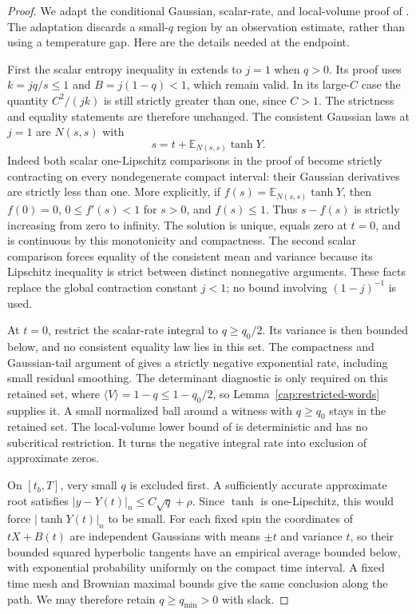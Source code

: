 \begin{proof}
We adapt the conditional Gaussian, scalar-rate, and local-volume proof of
\cite[Section~5]{AcceptedGap}.  The adaptation discards a small-$q$
region by an observation estimate, rather than using a temperature gap.
Here are the details needed at the endpoint.

First the scalar entropy inequality in \cite[Lemma~4.1]{AcceptedGap} extends
to $j=1$ when $q>0$. Its proof uses $k=jq/s\le1$ and $B=j(1-q)<1$, which
remain valid. In its large-$C$ case the quantity $C^2/(jk)$ is still strictly
greater than one, since $C>1$. The strictness and equality statements are
therefore unchanged. The consistent Gaussian laws at $j=1$ are $N(s,s)$ with
\[
 s=t+\mathbb E_{N(s,s)}\tanh Y.
\]
Indeed both scalar one-Lipschitz comparisons in the proof of
\cite[Lemma~4.2]{AcceptedGap} become strictly contracting on every
nondegenerate compact interval: their Gaussian derivatives are strictly less
than one. More explicitly, if $f(s)=\mathbb E_{N(s,s)}\tanh Y$, then $f(0)=0$,
$0\le f'(s)<1$ for $s>0$, and $f(s)\le1$. Thus $s-f(s)$ is strictly increasing
from zero to infinity. The solution is unique, equals zero at $t=0$, and is
continuous by this monotonicity and compactness. The second scalar comparison
forces equality of the consistent mean and variance because its Lipschitz
inequality is strict between distinct nonnegative arguments. These facts
replace the global contraction constant $j<1$; no bound involving $(1-j)^{-1}$
is used.

At $t=0$, restrict the scalar-rate integral to $q\ge q_0/2$. Its variance is
then bounded below, and no consistent equality law lies in this set. The
compactness and Gaussian-tail argument of \cite[Lemma~5.4]{AcceptedGap} gives
a strictly negative exponential rate, including small residual smoothing. The
determinant diagnostic is only required on this retained set, where $\langle
V\rangle=1-q\le1-q_0/2$, so Lemma~\ref{cap:restricted-words} supplies it. A
small normalized ball around a witness with $q\ge q_0$ stays in the retained
set. The local-volume lower bound of \cite[Lemma~5.6]{AcceptedGap} is
deterministic and has no subcritical restriction. It turns the negative
integral rate into exclusion of approximate zeros.

On $[t_b,T]$, very small $q$ is excluded first. A sufficiently accurate
approximate root satisfies $|y-Y(t)|_n\le C\sqrt q+\rho$. Since $\tanh$ is
one-Lipschitz, this would force $|\tanh Y(t)|_n$ to be small. For each fixed
spin the coordinates of $tX+B(t)$ are independent Gaussians with means $\pm t$
and variance $t$, so their bounded squared hyperbolic tangents have an
empirical average bounded below, with exponential probability uniformly on the
compact time interval. A fixed time mesh and Brownian maximal bounds give the
same conclusion along the path. We may therefore retain $q\ge q_{\min}>0$ with
slack.


\end{proof}
